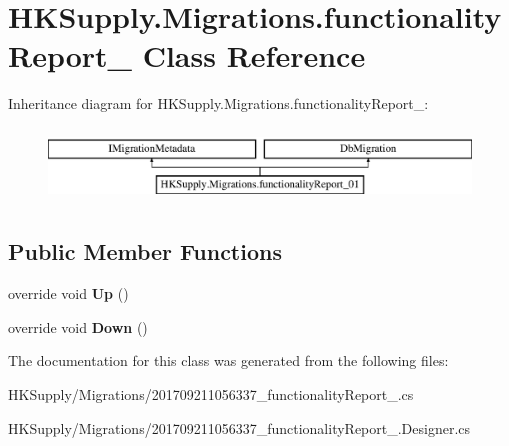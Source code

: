 \hypertarget{class_h_k_supply_1_1_migrations_1_1functionality_report__01}{}\section{H\+K\+Supply.\+Migrations.\+functionality\+Report\+\_ Class Reference}
\label{class_h_k_supply_1_1_migrations_1_1functionality_report__01}
Inheritance diagram for H\+K\+Supply.\+Migrations.\+functionality\+Report\+\_\+:\begin{figure}[H]
\begin{center}
\leavevmode
\includegraphics[height=2.000000cm]{class_h_k_supply_1_1_migrations_1_1functionality_report__01}
\end{center}
\end{figure}
\subsection*{Public Member Functions}
\begin{DoxyCompactItemize}
\item 
\mbox{\label{class_h_k_supply_1_1_migrations_1_1functionality_report__01_a85186392d0d0248976d842e020d8d0d8}} 
override void {\bfseries Up} ()
\item 
\mbox{\label{class_h_k_supply_1_1_migrations_1_1functionality_report__01_a6ad87a567ed6c8a27c886c892a9a8f25}} 
override void {\bfseries Down} ()
\end{DoxyCompactItemize}


The documentation for this class was generated from the following files\+:\begin{DoxyCompactItemize}
\item 
H\+K\+Supply/\+Migrations/201709211056337\+\_\+functionality\+Report\+\_.\+cs\item 
H\+K\+Supply/\+Migrations/201709211056337\+\_\+functionality\+Report\+\_.\+Designer.\+cs\end{DoxyCompactItemize}
